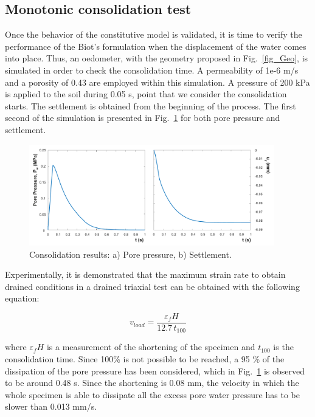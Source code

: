 \documentclass[preprint,12pt,a4paper]{elsarticle}
\begin{document}
\subsection{Monotonic consolidation test}
\label{sec:32}
Once the behavior of the constitutive model is validated, it is time to verify the performance of the Biot's formulation when the displacement of the water comes into place. Thus, an oedometer, with the geometry proposed in Fig.~\ref{fig_Geo}, is simulated in order to check the consolidation time. A permeability of 1e-6 m/s and a porosity of 0.43 are employed within this simulation. A pressure of 200 kPa is applied to the soil during 0.05 s, point that we consider the consolidation starts. The settlement is obtained from the beginning of the process. The first second of the simulation is presented in Fig.~\ref{fig_conso} for both pore pressure and settlement.
\begin{figure}
\centering
\includegraphics[width=0.95\textwidth]{Figs/conso.pdf}
\caption{Consolidation results: a) Pore pressure, b) Settlement.}
\label{fig_conso}
\end{figure}

Experimentally, it is demonstrated that the maximum strain rate to obtain drained conditions in a drained triaxial test can be obtained with the following equation:

\begin{equation}
v_{load}=\frac{\varepsilon_f H}{12.7 \, t_{100}}
\end{equation}\label{eq_drained}

where $\varepsilon_f H$ is a measurement of the shortening of the specimen and $t_{100}$ is the consolidation time. Since 100\% is not possible to be reached, a 95 \% of the dissipation of the pore pressure has been considered, which in Fig.~\ref{fig_conso} is observed to be around 0.48 s. Since the shortening is 0.08 mm, the velocity in which the whole specimen is able to dissipate all the excess pore water pressure has to be slower than 0.013 mm/s.
\end{document}
